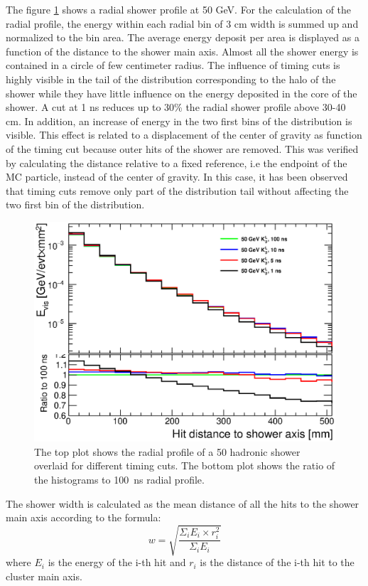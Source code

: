 The figure \ref{fig:RadialProfNoSmearing} shows a \kzeroL{} radial shower profile at 50 GeV. For the calculation of the radial profile, the energy within each radial bin of 3 cm width is summed up and normalized to the bin area. The average energy deposit per area is displayed as a function of the distance to the shower main axis. Almost all the shower energy is contained in a circle of few centimeter radius. The influence of timing cuts is highly visible in the tail of the distribution corresponding to the halo of the shower while they have little influence on the energy deposited in the core of the shower. A cut at 1 ns reduces up to 30\% the radial shower profile above 30-40 cm. In addition, an increase of energy in the two first bins of the distribution is visible. This effect is related to a displacement of the center of gravity as function of the timing cut because outer hits of the shower are removed. This was verified by calculating the distance relative to a fixed reference, i.e the endpoint of the MC particle, instead of the center of gravity. In this case, it has been observed that timing cuts remove only part of the distribution tail without affecting the two first bin of the distribution.

\begin{figure}[htbp!]
  \centering
  \includegraphics[width=0.6\linewidth]{../Thesis_Plots/ILD/NoSmearing/Plots/RadialProfileOverlay_noSmearing.eps}
  \caption{The top plot shows the radial profile of a 50 \GeV hadronic shower overlaid for different timing cuts. The bottom plot shows the ratio of the histograms to \SI{100}{\nano\second} radial profile.} \label{fig:RadialProfNoSmearing}
\end{figure}

The shower width is calculated as the mean distance of all the hits to the shower main axis according to the formula:
\begin{equation}
  w = \sqrt{\frac{\Sigma_i E_i \times r_i^2}{\Sigma_i E_i}}
\end{equation}
where $E_i$ is the energy of the i-th hit and $r_i$ is the distance of the i-th hit to the cluster main axis.

